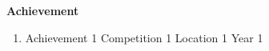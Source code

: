 

\textbf{Achievement}

\hline

\begin{enumerate}
    \item {{Achievement 1} %
            {Competition 1} %
            {Location 1} %
            {Year 1}} %
\end{enumerate}
